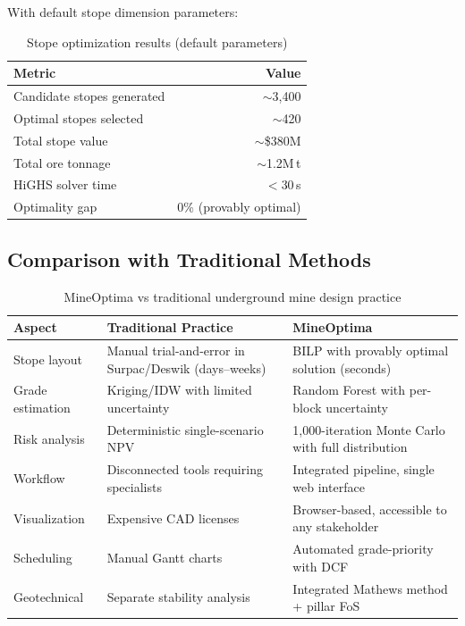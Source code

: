 \documentclass[12pt,a4paper]{article}
\begin{document}
With default stope dimension parameters:

\begin{table}[H]
\centering
\caption{Stope optimization results (default parameters)}
\begin{tabular}{@{}lr@{}}
\toprule
\textbf{Metric} & \textbf{Value} \\
\midrule
Candidate stopes generated & $\sim$3{,}400 \\
Optimal stopes selected & $\sim$420 \\
Total stope value & $\sim$\$380M \\
Total ore tonnage & $\sim$1.2M\,t \\
HiGHS solver time & $<$30\,s \\
Optimality gap & 0\% (provably optimal) \\
\bottomrule
\end{tabular}
\end{table}

\subsection{Comparison with Traditional Methods}

\begin{table}[H]
\centering
\caption{MineOptima vs traditional underground mine design practice}
\small
\begin{tabular}{@{}p{3cm}p{5cm}p{5cm}@{}}
\toprule
\textbf{Aspect} & \textbf{Traditional Practice} & \textbf{MineOptima} \\
\midrule
Stope layout & Manual trial-and-error in Surpac/Deswik (days--weeks) & BILP with provably optimal solution (seconds) \\
Grade estimation & Kriging/IDW with limited uncertainty & Random Forest with per-block uncertainty \\
Risk analysis & Deterministic single-scenario NPV & 1{,}000-iteration Monte Carlo with full distribution \\
Workflow & Disconnected tools requiring specialists & Integrated pipeline, single web interface \\
Visualization & Expensive CAD licenses & Browser-based, accessible to any stakeholder \\
Scheduling & Manual Gantt charts & Automated grade-priority with DCF \\
Geotechnical & Separate stability analysis & Integrated Mathews method + pillar FoS \\
\bottomrule
\end{tabular}
\end{table}
\end{document}
